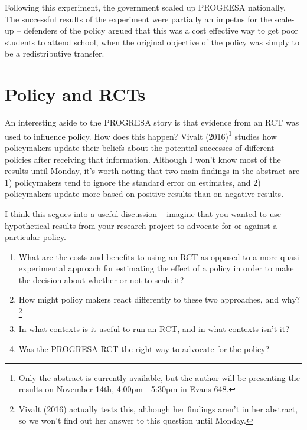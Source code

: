 \documentclass[12pt,english]{article}
\begin{document}
Following this experiment, the government scaled up PROGRESA nationally. The successful results of the experiment were partially an impetus for the scale-up -- defenders of the policy argued that this was a cost effective way to get poor students to attend school, when the original objective of the policy was simply to be a redistributive transfer.

\section{Policy and RCTs}

An interesting aside to the PROGRESA story is that evidence from an RCT was used to influence policy. How does this happen? Vivalt (2016)\footnote{Only the abstract is currently available, but the author will be presenting the results on November 14th, 4:00pm - 5:30pm in Evans 648.} studies how policymakers update their beliefs about the potential successes of different policies after receiving that information. Although I won't know most of the results until Monday, it's worth noting that two main findings in the abstract are 1) policymakers tend to ignore the standard error on estimates, and 2) policymakers update more based on positive results than on negative results.

I think this segues into a useful discussion -- imagine that you wanted to use hypothetical results from your research project to advocate for or against a particular policy.
\newpage

\begin{enumerate}
	\item What are the costs and benefits to using an RCT as opposed to a more quasi-experimental approach for estimating the effect of a policy in order to make the decision about whether or not to scale it?
	\vspace{8em}
	\item How might policy makers react differently to these two approaches, and why?\footnote{Vivalt (2016) actually tests this, although her findings aren't in her abstract, so we won't find out her answer to this question until Monday.}
	\vspace{8em}
	\item In what contexts is it useful to run an RCT, and in what contexts isn't it?
	\vspace{8em}
	\item Was the PROGRESA RCT the right way to advocate for the policy?
	\vspace{8em}
\end{enumerate}
\end{document}
